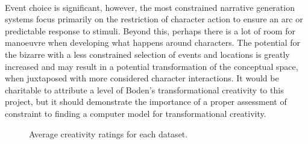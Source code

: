 \documentclass[letterpaper]{article}
\begin{document}
\\Event choice is significant, however, the most constrained narrative generation systems focus primarily on the restriction of character action to ensure an arc or predictable response to stimuli. Beyond this, perhaps there is a lot of room for manoeuvre when developing what happens around characters. The potential for the bizarre with a less constrained selection of events and locations is greatly increased and may result in a potential transformation of the conceptual space, when juxtaposed with more considered character interactions. It would be charitable to attribute a level of Boden's transformational creativity to this project, but it should demonstrate the importance of a proper assessment of constraint to finding a computer model for transformational creativity.
\begin{figure}[h!]
\centering
{}
\caption[Average Creativity by Dataset]{Average creativity ratings for each dataset.}
\label{fig:acr}
\end{figure}
\end{document}
